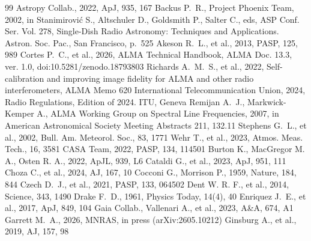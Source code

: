 \documentclass[twocolumn,twocolappendix]{openjournal}
\begin{document}
%
%
%
%
%
\begin{thebibliography}{99}
 Astropy Collab., 2022, ApJ, 935, 167
 Backus P.~R., Project Phoenix Team, 2002, in Stanimirovi\'{c} S., Altschuler D., Goldsmith P., Salter C., eds, ASP Conf. Ser. Vol. 278, Single-Dish Radio Astronomy: Techniques and Applications. Astron. Soc. Pac., San Francisco, p.~525
 Akeson R.~L., et al., 2013, PASP, 125, 989
 Cortes P.~C., et al., 2026, ALMA Technical Handbook, ALMA Doc. 13.3, ver. 1.0, doi:10.5281/zenodo.18793803
 Richards A.~M.~S., et al., 2022, Self-calibration and improving image fidelity for ALMA and other radio interferometers, ALMA Memo 620
 International Telecommunication Union, 2024, Radio Regulations, Edition of 2024. ITU, Geneva
 Remijan A.~J., Markwick-Kemper A., ALMA Working Group on Spectral Line Frequencies, 2007, in American Astronomical Society Meeting Abstracts 211, 132.11
 Stephens G.~L., et al., 2002, Bull. Am. Meteorol. Soc., 83, 1771
 Wehr T., et al., 2023, Atmos. Meas. Tech., 16, 3581
 CASA Team, 2022, PASP, 134, 114501
 Burton K., MacGregor M. A., Osten R. A., 2022, ApJL, 939, L6
 Cataldi G., et al., 2023, ApJ, 951, 111
 Choza C., et al., 2024, AJ, 167, 10
 Cocconi G., Morrison P., 1959, Nature, 184, 844
 Czech D.~J., et al., 2021, PASP, 133, 064502
 Dent W. R. F., et al., 2014, Science, 343, 1490
 Drake F.~D., 1961, Physics Today, 14(4), 40
 Enriquez J.~E., et al., 2017, ApJ, 849, 104
 Gaia Collab., Vallenari A., et al., 2023, A\&A, 674, A1
 Garrett M.~A., 2026, MNRAS, in press (arXiv:2605.10212)
 Ginsburg A., et al., 2019, AJ, 157, 98

\end{thebibliography}
\end{document}
